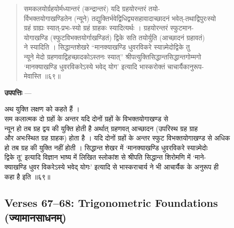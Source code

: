 \documentclass[11pt,a4paper]{article}
\newcommand{\dev}[1]{{\devanagarifont #1}}
\newcommand{\skt}[1]{{\devanagarifont\color{sktcolor} #1}}
\newenvironment{shloka}{%
  \begin{quote}%
  \smallskip%
  \devanagarifont\color{sktcolor}%
}{%
  \smallskip%
  \end{quote}%
}
\newenvironment{upapatti}{%
  \smallskip%
  \noindent\textbf{\devanagarifont उपपत्तिः} — \devanagarifont\small%
}{%
  \par\smallskip%
}
\begin{document}
\vspace{0.5cm}

\begin{shloka}
\skt{समकलयोर्ग्रहयोर्मध्यान्तरं} (कन्द्रान्तरं) \skt{यदि ग्रहयोरन्तरं तयो-}\\
\skt{र्विभक्तयोगाखण्डितेन} (न्यूने) \skt{तद्युक्तिर्भवेद्विधिद्व्यसहावादाच्छादनं भवेत्-तथाद्विपुरःस्यो}\\
\skt{ग्रहं ग्राह्यः स्यात्-प्रभः-स्यो ग्रहं ग्राहकः स्यादित्यर्थः । ग्रहयोरन्तरं स्फुटमान-}\\
\skt{योगाखण्डि} (स्फुटविभक्तयोर्गाखण्डितं) \skt{द्विके सति तयोर्युति} (आच्छादनं ग्रहावतं)\\
\skt{ने स्यादिति । सिद्धान्तशेखरे ``मानक्याखण्डि धुवरविकरे स्यान्न्मेदोद्विके तु}\\
\skt{न्यूने मेदो ग्रहणवाद्विहच्छादकोऽस्तनः स्यात्'' श्रीपत्युक्तिसिद्धान्तसिद्धान्तगोम्मगो}\\
\skt{`मानक्याखण्डि धुवरविकरेऽस्ये भवेद् योग' इत्यादि भास्करोक्तं चाचार्यैकानुरूप-}\\
\skt{मेवास्ति} ॥६९॥
\end{shloka}

\vspace{0.5cm}

\begin{upapatti}
अथ युक्ति लक्षण को कहते हैं ।\\[0.5em]
\skt{सम कलात्मक दो ग्रहों के अन्तर यदि दोनों ग्रहों के विभक्तयोगाखण्ड से}\\
\skt{न्यून हो तब ग्रह द्वय की युक्ति होती है अर्थात् ग्रहणवत् आच्छादन (उपरिस्थ ग्रह ग्राह}\\
\skt{और अभःस्थित ग्रह ग्राहक) होता है । यदि दोनों ग्रहों के अन्तर स्फुट विभक्तयोगाखण्ड से अधिक}\\
\skt{हो तब ग्रह की युक्ति नहीं होती । सिद्धान्त शेखर में `मानक्याखण्डि धुवरविकरे स्यान्न्मेदोः}\\
\skt{द्विके तू' इत्यादि विज्ञान भाष्य में लिखित स्लोकांश से श्रीपति सिद्धान्त शिरोमणि में `माने-}\\
\skt{क्याखण्डि धुवर विकरेऽस्ये भवेद् योगः' इत्यादि से भास्कराचार्य ने भी आचार्यैक के अनुरूप ही}\\
\skt{कहा है इति} ॥६९॥
\end{upapatti}

\subsection*{Verses 67--68: Trigonometric Foundations (\dev{ज्यामानसाधनम्})}
\end{document}
